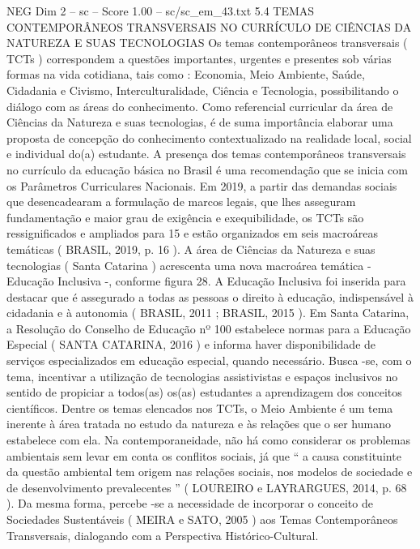 \begin{textsample}{NEG Dim 2 – sc – Score 1.00 – sc/sc\_em\_43.txt}  \label{ex:f2_neg_273}
5.4 TEMAS CONTEMPORÂNEOS TRANSVERSAIS NO CURRÍCULO DE CIÊNCIAS DA NATUREZA E SUAS TECNOLOGIAS Os temas contemporâneos transversais ( TCTs ) correspondem a questões importantes, urgentes e presentes sob várias formas na vida cotidiana, tais como : Economia, Meio Ambiente, Saúde, Cidadania e Civismo, Interculturalidade, Ciência e Tecnologia, possibilitando o diálogo com as áreas do conhecimento.
Como referencial curricular da área de Ciências da Natureza e suas tecnologias, é de suma importância elaborar uma proposta de concepção do conhecimento contextualizado na realidade local, social e individual do(a) estudante.
A presença dos temas contemporâneos transversais no currículo da educação básica no Brasil é uma recomendação que se inicia com os Parâmetros Curriculares Nacionais.
Em 2019, a partir das demandas sociais que desencadearam a formulação de marcos legais, que lhes asseguram fundamentação e maior grau de exigência e exequibilidade, os TCTs são ressignificados e ampliados para 15 e estão organizados em seis macroáreas temáticas ( BRASIL, 2019, p. 16 ).
A área de Ciências da Natureza e suas tecnologias ( Santa Catarina ) acrescenta uma nova macroárea temática - Educação Inclusiva -, conforme figura 28.
A Educação Inclusiva foi inserida para destacar que é assegurado a todas as pessoas o direito à educação, indispensável à cidadania e à autonomia ( BRASIL, 2011 ; BRASIL, 2015 ).
Em Santa Catarina, a Resolução do Conselho de Educação nº 100 estabelece normas para a Educação Especial ( SANTA CATARINA, 2016 ) e informa haver disponibilidade de serviços especializados em educação especial, quando necessário.
Busca -se, com o tema, incentivar a utilização de tecnologias assistivistas e espaços inclusivos no sentido de propiciar a todos(as) os(as) estudantes a aprendizagem dos conceitos científicos.
Dentre os temas elencados nos TCTs, o Meio Ambiente é um tema inerente à área tratada no estudo da natureza e às relações que o ser humano estabelece com ela.
Na contemporaneidade, não há como considerar os problemas ambientais sem levar em conta os conflitos sociais, já que “ a causa constituinte da questão ambiental tem origem nas relações sociais, nos modelos de sociedade e de desenvolvimento prevalecentes ” ( LOUREIRO e LAYRARGUES, 2014, p. 68 ).
Da mesma forma, percebe -se a necessidade de incorporar o conceito de Sociedades Sustentáveis ( MEIRA e SATO, 2005 ) aos Temas Contemporâneos Transversais, dialogando com a Perspectiva Histórico-Cultural.

\end{textsample}
